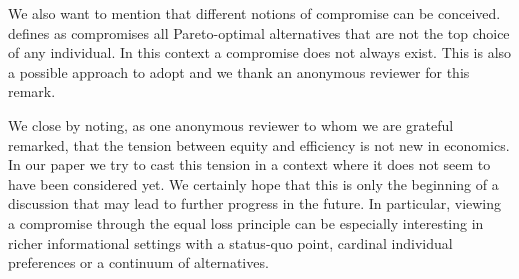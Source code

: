 We also want to mention that different notions of compromise can be conceived. \citet{Borgers1991} defines as compromises all Pareto-optimal alternatives that are not the top choice of any individual. In this context a compromise does not always exist. This is also a possible approach to adopt and we thank an anonymous reviewer for this remark.

We close by noting, as one anonymous reviewer to whom we are grateful remarked, that the tension between equity and efficiency is not new in economics. In our paper we try to cast this tension in a context where it does not seem to have been considered yet. We certainly hope that this is only the beginning of a discussion that may lead to further progress in the future. In particular, viewing a compromise through the equal loss principle can be especially interesting in richer informational settings with a status-quo point, cardinal individual preferences or a continuum of alternatives.




